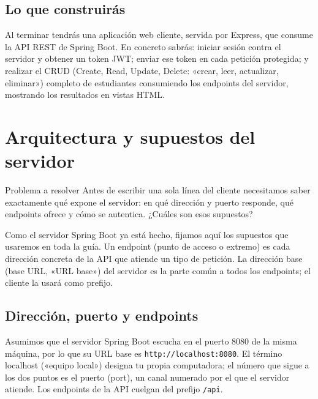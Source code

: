 \documentclass[11pt]{article}
\begin{document}
\subsection{Lo que construirás}
Al terminar tendrás una aplicación web cliente, servida por Express, que consume la API REST de Spring Boot. En concreto sabrás: iniciar sesión contra el servidor y obtener un token JWT; enviar ese token en cada petición protegida; y realizar el CRUD (Create, Read, Update, Delete: «crear, leer, actualizar, eliminar») completo de estudiantes consumiendo los endpoints del servidor, mostrando los resultados en vistas HTML.

\section{Arquitectura y supuestos del servidor}
\begin{cajaproblema}{Problema a resolver}
Antes de escribir una sola línea del cliente necesitamos saber exactamente qué expone el servidor: en qué dirección y puerto responde, qué endpoints ofrece y cómo se autentica. ¿Cuáles son esos supuestos?\par
\end{cajaproblema}
Como el servidor Spring Boot ya está hecho, fijamos aquí los supuestos que usaremos en toda la guía. Un endpoint (punto de acceso o extremo) es cada dirección concreta de la API que atiende un tipo de petición. La dirección base (base URL, «URL base») del servidor es la parte común a todos los endpoints; el cliente la usará como prefijo.

\subsection{Dirección, puerto y endpoints}
Asumimos que el servidor Spring Boot escucha en el puerto 8080 de la misma máquina, por lo que su URL base es \texttt{http://\allowbreak{}localhost:\allowbreak{}8080}. El término localhost («equipo local») designa tu propia computadora; el número que sigue a los dos puntos es el puerto (port), un canal numerado por el que el servidor atiende. Los endpoints de la API cuelgan del prefijo \texttt{/api}.
\end{document}

